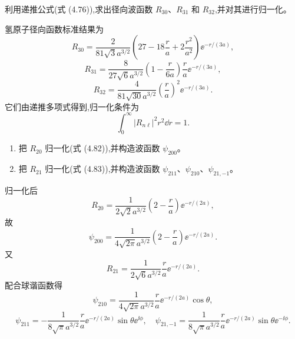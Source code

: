 \begin{question}
利用递推公式(式 (4.76)),求出径向波函数 $R_{30}$、$R_{31}$ 和 $R_{32}$,并对其进行归一化。

\par\smallskip
{}

\end{question}
\begin{solution}

氢原子径向函数标准结果为
\[
R_{30}=\frac{2}{81\sqrt3a^{3/2}}\left(27-18\frac{r}{a}+2\frac{r^2}{a^2}\right)\ee^{-r/(3a)},
\]
\[
R_{31}=\frac{8}{27\sqrt6a^{3/2}}\left(1-\frac{r}{6a}\right)\frac{r}{a}\ee^{-r/(3a)},
\]
\[
R_{32}=\frac{4}{81\sqrt{30}a^{3/2}}\left(\frac{r}{a}\right)^2\ee^{-r/(3a)}.
\]
它们由递推多项式得到,归一化条件为
\[
\int_0^\infty |R_{n\ell}|^2r^2\dd r=1.
\]

\end{solution}

\begin{question}
\begin{enumerate}
\item 把 $R_{20}$ 归一化(式 (4.82)),并构造波函数 $\psi_{200}$。
\item 把 $R_{21}$ 归一化(式 (4.83)),并构造波函数 $\psi_{211}$、$\psi_{210}$、$\psi_{21,-1}$。
\end{enumerate}

\par\smallskip
{}

\end{question}
\begin{solution}

归一化后
\[
R_{20}=\frac{1}{2\sqrt2a^{3/2}}\left(2-\frac{r}{a}\right)\ee^{-r/(2a)},
\]
故
\[
\psi_{200}=\frac{1}{4\sqrt{2\pi}a^{3/2}}\left(2-\frac{r}{a}\right)\ee^{-r/(2a)}.
\]
又
\[
R_{21}=\frac{1}{2\sqrt6a^{3/2}}\frac{r}{a}\ee^{-r/(2a)}.
\]
配合球谐函数得
\[
\psi_{210}=\frac{1}{4\sqrt{2\pi}a^{3/2}}\frac{r}{a}\ee^{-r/(2a)}\cos\theta,
\]
\[
\psi_{211}=-\frac{1}{8\sqrt\pi a^{3/2}}\frac{r}{a}\ee^{-r/(2a)}\sin\theta \ee^{\ii\phi},
\quad
\psi_{21,-1}=\frac{1}{8\sqrt\pi a^{3/2}}\frac{r}{a}\ee^{-r/(2a)}\sin\theta \ee^{-\ii\phi}.
\]

\end{solution}

